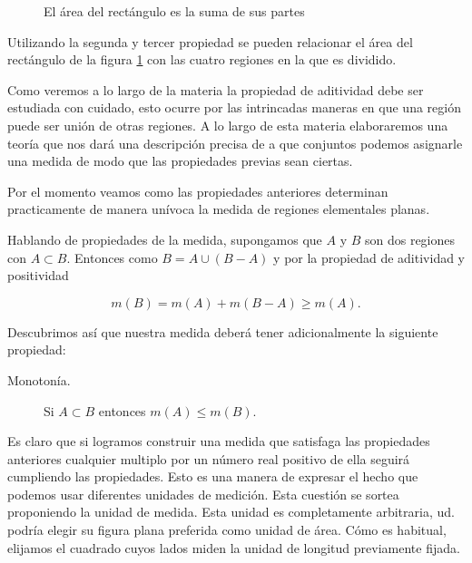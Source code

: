 \begin{figure}[h]
\begin{center}
 
 \caption{El área del rectángulo es la suma de sus partes}\label{fig:rect_descop} 
\end{center}
\end{figure}

Utilizando la segunda y tercer propiedad se pueden relacionar el área del rectángulo de la figura \ref{fig:rect_descop} con las cuatro regiones en la que es dividido.

Como veremos a lo largo de la materia la propiedad de aditividad debe ser estudiada con cuidado, esto ocurre por las intrincadas maneras en que una región puede ser unión de otras regiones. A lo largo de esta materia elaboraremos una  teoría que nos dará una descripción  precisa de a que conjuntos podemos asignarle una medida de modo que las propiedades previas sean ciertas. 

Por el momento veamos como las propiedades anteriores determinan practicamente de manera unívoca la medida de regiones elementales planas.  


Hablando de propiedades de la medida, supongamos que $A$ y $B$ son dos regiones con $A\subset B$. Entonces como $B=A\cup (B-A)$ y por la propiedad de aditividad y positividad

\[
 m(B)=m(A)+m(B-A)\geq m(A).
\]

Descubrimos así que nuestra medida deberá tener adicionalmente la siguiente propiedad:
\begin{description}
 \item[Monotonía.] Si $A\subset B$ entonces $m(A)\leq m(B)$. 
\end{description}
Es claro que si logramos construir una medida que satisfaga las propiedades anteriores cualquier multiplo por un número real positivo  de ella seguirá cumpliendo las propiedades. Esto es una manera de expresar el hecho que podemos usar diferentes unidades de medición. Esta cuestión se sortea proponiendo la unidad de medida. Esta unidad es completamente arbitraria, ud. podría elegir su figura plana preferida como unidad de área.   Cómo es habitual, elijamos el cuadrado cuyos lados miden la unidad de longitud previamente fijada. 


